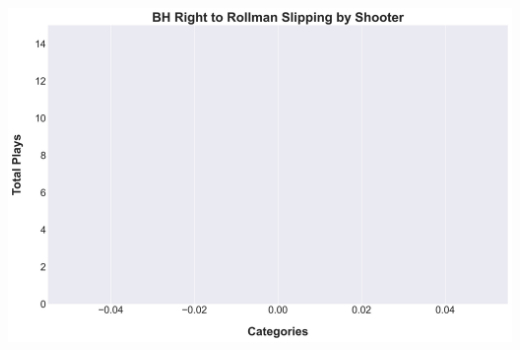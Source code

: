 \documentclass[a4paper,12pt]{article}
\begin{document}
\begin{table}[H]
{\begin{minipage}[t]{0.6\textwidth}
{\begin{tabular}
            \bottomrule
        \end{tabular}
        } %
    \end{minipage}
    } %
    \hfill %
    \begin{minipage}[c]{0.35\textwidth} %
        \flushright
        \includegraphics[width=\textwidth, height=.14\textheight]{images/PNR_PassRightSlipsPlayer_Freq.png} %
    \end{minipage}
\end{table}

\vspace{-1em} %
\vspace{-1em} %
\end{document}
